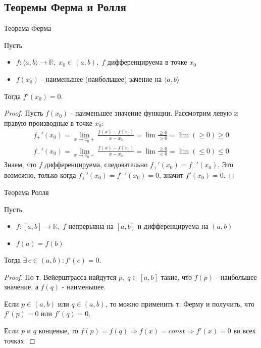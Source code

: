 \subsection{Теоремы Ферма и Ролля \href{https://youtu.be/OXDjegAsmSU?t=4968}{\Walley}}
\begin{theorem-non}
    Теорема Ферма

    Пусть
    \begin{itemize}
        \item $f: \langle a, b \rangle \to \mathbb{R}, \; x_0 \in (a, b), \; f$ дифференцируема в точке $x_0$
        \item $f(x_0)$ - наименьшее (наибольшее) зачение на $\langle a, b \rangle$
    \end{itemize}
    Тогда $f'(x_0) = 0$.
\end{theorem-non}
\begin{proof}
    Пусть $f(x_0)$ - наименьшее значение функции. Рассмотрим левую и правую производные в точке $x_0$:
    \begin{gather*}
        f_+'(x_0) = \lim_{x \to x_0+} \frac{f(x) - f(x_0)}{x - x_0} = \lim \frac{\geqslant 0}{> 0} = \lim (\geqslant 0) \geqslant 0 \\
        f_-'(x_0) = \lim_{x \to x_0-} \frac{f(x) - f(x_0)}{x - x_0} = \lim \frac{\geqslant 0}{< 0} = \lim (\leqslant 0) \leqslant 0 
    \end{gather*}   
    Знаем, что $f$ дифференцируема, следовательно $f_+'(x_0) = f_-'(x_0)$. Это возможно, только когда $f_+'(x_0) = f_-'(x_0) = 0$, значит $f'(x_0) = 0$.
\end{proof}

\begin{theorem-non}
    Теорема Ролля

    Пусть 
    \begin{itemize}
        \item $f: [a, b] \to \mathbb{R}, \; f$ непрерывна на $[a, b]$ и дифференцируема на $(a, b)$
        \item $f(a) = f(b)$
    \end{itemize}
    Тогда $\exists \, c \in (a, b) : f'(c) = 0$.
\end{theorem-non}
\begin{proof}
    По т. Вейерштрасса найдутся $p, \; q \in [a, b]$ такие, что $f(p)$ - наибольшее значение, а $f(q)$ - наименьшее.
    
    Если $p \in (a, b)$ или $q \in (a, b)$, то можно применить т. Ферму и получить, что $f'(p) = 0$ или $f'(q) = 0$.

    Если $p$ и $q$ концевые, то $f(p) = f(q) \Rightarrow f(x) = const \Rightarrow f'(x) = 0$ во всех точках.
\end{proof}